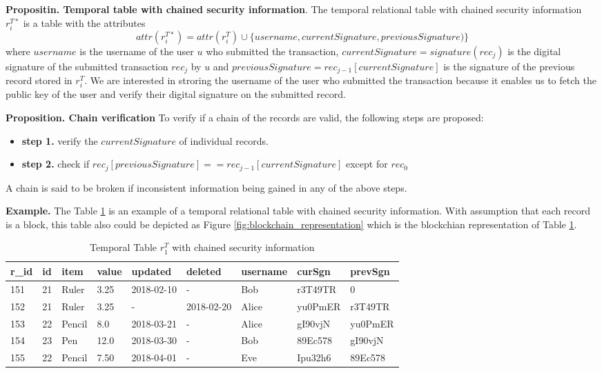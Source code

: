 \textbf{Propositin. Temporal table with chained security information}.  The temporal relational table with chained security information $r_i^{T*}$ is a table with the attributes $$attr(r_i^{T*}) = attr(r_i^T) \cup \{username,currentSignature, previousSignature)\}$$ where $username$ is the username of the user $u$ who submitted the transaction, $currentSignature = signature(rec_j)$ is the digital signature of the submitted transaction $rec_j$ by $u$ and $previousSignature = rec_{j-1}[currentSignature]$ is the signature of the previous record stored in $r_i^T$. We are interested in stroring the username of the user who submitted the transaction because it enables us to fetch the public key of the user and verify their digital signature on the submitted record.

\textbf{Proposition. Chain verification}
To verify if a chain of the records are valid, the following steps are proposed:

\begin{itemize}
	\item \textbf{step 1.} verify the $currentSignature$ of individual records.
	\item \textbf{step 2.} check if $rec_j[previousSignature] == rec_{j-1}[currentSignature]$ except for $rec_0$
\end{itemize}

A chain is said to be broken if inconsistent information being gained in any of the above steps.

\textbf{Example.} The Table \ref{temporal_blockchain_table} is an example of a temporal relational table with chained security information. With assumption that each record is a block, this table also could be depicted as Figure \ref{fig:blockchain_representation} which is the blockchian representation of Table \ref{temporal_blockchain_table}.

\begin{center}
\begin{table}
	\centering
	\footnotesize
	\caption{Temporal Table $r_1^T$ with chained security information}
	\label{temporal_blockchain_table}
	\begin{tabular}{p{0.5cm}p{0.5cm}p{1cm}p{0.5cm}p{1.7cm}p{1.7cm}p{1.5cm}p{1.5cm}p{1.5cm}}
		\hline
		r\_id & id & item      & value  & updated  & deleted & username & curSgn & prevSgn \\ \hline
		151& 21 & Ruler    & 3.25  & 2018-02-10  &  - & Bob &r3T49TR & 0\\  
		152& 21 & Ruler    & 3.25  & -  &  2018-02-20 & Alice & yu0PmER & r3T49TR\\
		153& 22 & Pencil    & 8.0  & 2018-03-21  &  - & Alice & gI90vjN & yu0PmER\\
		154& 23 & Pen    & 12.0  & 2018-03-30  &  - & Bob & 89Ec578 & gI90vjN\\
		155& 22 & Pencil & 7.50  & 2018-04-01 & - & Eve & Ipu32h6 & 89Ec578\\ \hline
	\end{tabular}
\end{table} 
\end{center}

